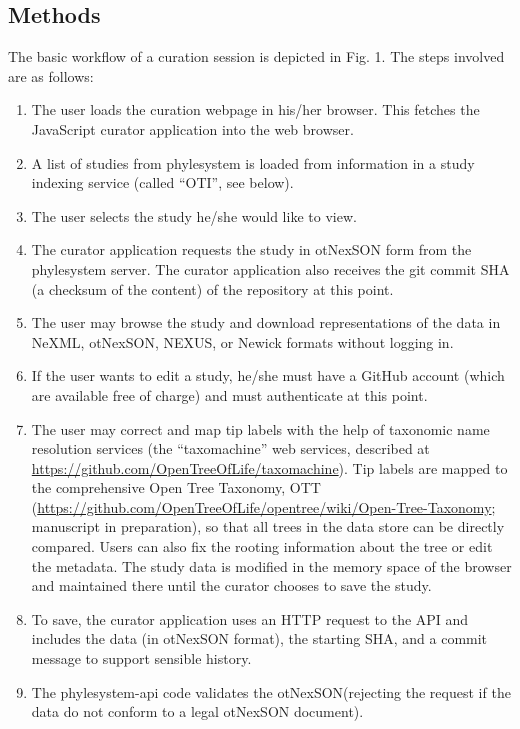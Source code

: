 \documentclass{bioinfo}
\newcommand{\ps}{phylesystem\xspace}
\newcommand{\nexson}{otNexSON\xspace}
\newcommand{\js}{JavaScript\xspace}
\begin{document}
\begin{methods}
\section{Methods}
The basic workflow of a curation session is depicted in Fig. 1. The steps involved are as follows:
\begin{enumerate}
    \item \label{loadAppStep} The user loads the curation webpage in his/her browser.  This fetches the \js curator application into the web browser.
    \item \label{otiListStep} A list of studies from \ps is loaded from information in a study indexing service (called ``OTI'', see below).
    \item The user selects the study he/she would like to view.
    \item \label{getStudyStep} The curator application requests the study in \nexson form from the \ps server.
        The curator application also receives the git commit SHA (a checksum of the content) of the repository at this point.
    \item \label{browseStep} The user may browse the study and download representations of the data in NeXML, \nexson, NEXUS\cite{NEXUS}, or Newick formats without logging in.
    \item \label{authStep} If the user wants to edit a study, he/she must have a GitHub account (which are available free of charge) and must authenticate at this point.
    \item \label{userEditStep} The user may correct and map tip labels with the help of taxonomic name resolution services (the ``taxomachine'' web services, described at
        \url{https://github.com/OpenTreeOfLife/taxomachine}). Tip labels are mapped to the 
        comprehensive Open Tree Taxonomy, OTT (\url{https://github.com/OpenTreeOfLife/opentree/wiki/Open-Tree-Taxonomy}; manuscript in preparation), so that all trees in the data 
        store can be directly compared. 
        Users can also fix the rooting information about the tree or edit the metadata.
        The study data is modified in the memory space of the
        browser and maintained there until the curator chooses to save the study.
    \item \label{putStep} To save, the curator application uses an
      HTTP request to the API and includes the data (in \nexson format), the starting SHA, and a commit message to support sensible history. 
    \item \label{validateStep} The \ps-api code validates the \nexson (rejecting the request if the data do not conform to a legal \nexson document).

\end{enumerate}
\end{methods}
\end{document}
